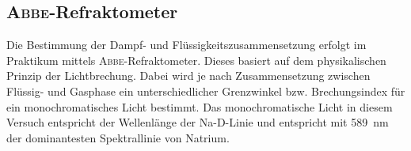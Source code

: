 \subsection*{\textsc{Abbe}-Refraktometer}
Die Bestimmung der Dampf- und Flüssigkeitszusammensetzung erfolgt im Praktikum mittels \textsc{Abbe}-Refraktometer. Dieses basiert auf dem physikalischen Prinzip der Lichtbrechung. Dabei wird je nach Zusammensetzung zwischen Flüssig- und Gasphase ein unterschiedlicher Grenzwinkel bzw. Brechungsindex für ein monochromatisches Licht bestimmt. Das monochromatische Licht in diesem Versuch entspricht der Wellenlänge der Na-D-Linie und entspricht mit \SI{589}{\nano \meter} der dominantesten Spektrallinie von Natrium. 